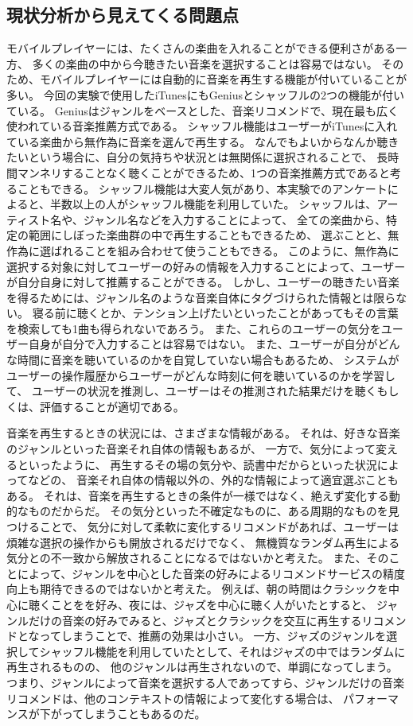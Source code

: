 \documentclass[11pt, twocolumn]{jsarticle}
\begin{document}
\subsection{現状分析から見えてくる問題点}
モバイルプレイヤーには、たくさんの楽曲を入れることができる便利さがある一方、
多くの楽曲の中から今聴きたい音楽を選択することは容易ではない。
そのため、モバイルプレイヤーには自動的に音楽を再生する機能が付いていることが多い。
今回の実験で使用したiTunesにもGeniusとシャッフルの2つの機能が付いている。
Geniusはジャンルをベースとした、音楽リコメンドで、現在最も広く使われている音楽推薦方式である。
シャッフル機能はユーザーがiTunesに入れている楽曲から無作為に音楽を選んで再生する。
なんでもよいからなんか聴きたいという場合に、自分の気持ちや状況とは無関係に選択されることで、
長時間マンネリすることなく聴くことができるため、1つの音楽推薦方式であると考ることもできる。
シャッフル機能は大変人気があり、本実験でのアンケートによると、半数以上の人がシャッフル機能を利用していた。
シャッフルは、アーティスト名や、ジャンル名などを入力することによって、
全ての楽曲から、特定の範囲にしぼった楽曲群の中で再生することもできるため、
選ぶことと、無作為に選ばれることを組み合わせて使うこともできる。
このように、無作為に選択する対象に対してユーザーの好みの情報を入力することによって、ユーザーが自分自身に対して推薦することができる。
しかし、ユーザーの聴きたい音楽を得るためには、ジャンル名のような音楽自体にタグづけられた情報とは限らない。
寝る前に聴くとか、テンション上げたいといったことがあってもその言葉を検索しても1曲も得られないであろう。
また、これらのユーザーの気分をユーザー自身が自分で入力することは容易ではない。
また、ユーザーが自分がどんな時間に音楽を聴いているのかを自覚していない場合もあるため、
システムがユーザーの操作履歴からユーザーがどんな時刻に何を聴いているのかを学習して、
ユーザーの状況を推測し、ユーザーはその推測された結果だけを聴くもしくは、評価することが適切である。

音楽を再生するときの状況には、さまざまな情報がある。
それは、好きな音楽のジャンルといった音楽それ自体の情報もあるが、
一方で、気分によって変えるといったように、
再生するその場の気分や、読書中だからといった状況によってなどの、
音楽それ自体の情報以外の、外的な情報によって適宜選ぶこともある。
それは、音楽を再生するときの条件が一様ではなく、絶えず変化する動的なものだからだ。
その気分といった不確定なものに、ある周期的なものを見つけることで、
気分に対して柔軟に変化するリコメンドがあれば、ユーザーは煩雑な選択の操作からも開放されるだけでなく、
無機質なランダム再生による気分との不一致から解放されることになるではないかと考えた。
また、そのことによって、ジャンルを中心とした音楽の好みによるリコメンドサービスの精度向上も期待できるのではないかと考えた。
例えば、朝の時間はクラシックを中心に聴くことをを好み、夜には、ジャズを中心に聴く人がいたとすると、
ジャンルだけの音楽の好みでみると、ジャズとクラシックを交互に再生するリコメンドとなってしまうことで、推薦の効果は小さい。
一方、ジャズのジャンルを選択してシャッフル機能を利用していたとして、それはジャズの中ではランダムに再生されるものの、
他のジャンルは再生されないので、単調になってしまう。
つまり、ジャンルによって音楽を選択する人であってすら、ジャンルだけの音楽リコメンドは、他のコンテキストの情報によって変化する場合は、
パフォーマンスが下がってしまうこともあるのだ。
\end{document}
